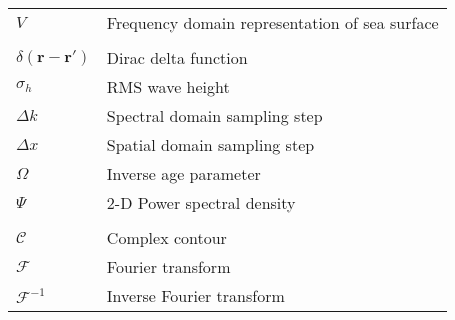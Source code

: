 \begin{supertabular}{ll}
$V$ & Frequency domain representation of sea surface\\
\\
$\delta\left(\mathbf{r}-\mathbf{r}' \right)$ & Dirac delta function \\
$\sigma_h$ & RMS wave height \\
$\Delta k$ & Spectral domain sampling step \\
$\Delta x$ & Spatial domain sampling step \\
$\Omega$ & Inverse age parameter \\
$\Psi $ & 2-D Power spectral density \\
\\
$\mathcal{C}$ & Complex contour \\
$\mathcal{F}$ & Fourier transform \\
$\mathcal{F}^{-1}$ & Inverse Fourier transform \\
\end{supertabular}